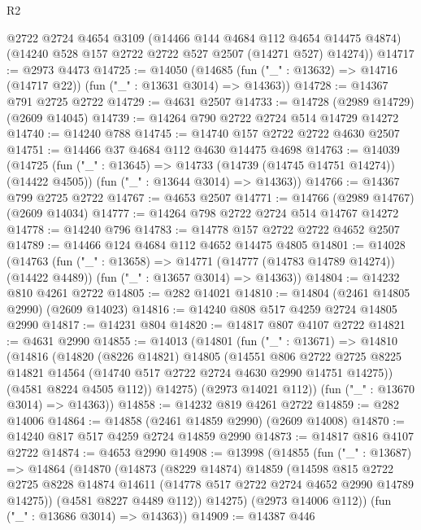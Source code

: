 \begin{lexlean}{R2}
\begin{coremodule}
      @2722
      @2724
      @4654
      @3109
      (@14466 @144 @4684 @112 @4654 @14475 @4874)
      (@14240 @528 @157 @2722 @2722 @527 @2507 (@14271 @527) @14274))
@14717 := @2973 @4473
@14725 := @14050
    (@14685 (fun ("_" : @13632) => @14716 (@14717 @22)) (fun ("_" : @13631 @3014) => @14363))
@14728 := @14367 @791 @2725 @2722
@14729 := @4631 @2507
@14733 := @14728 (@2989 @14729) (@2609 @14045)
@14739 := @14264 @790 @2722 @2724 @514 @14729 @14272
@14740 := @14240 @788
@14745 := @14740 @157 @2722 @2722 @4630 @2507
@14751 := @14466 @37 @4684 @112 @4630 @14475 @4698
@14763 := @14039
    (@14725
      (fun ("_" : @13645) => @14733 (@14739 (@14745 @14751 @14274)) (@14422 @4505))
      (fun ("_" : @13644 @3014) => @14363))
@14766 := @14367 @799 @2725 @2722
@14767 := @4653 @2507
@14771 := @14766 (@2989 @14767) (@2609 @14034)
@14777 := @14264 @798 @2722 @2724 @514 @14767 @14272
@14778 := @14240 @796
@14783 := @14778 @157 @2722 @2722 @4652 @2507
@14789 := @14466 @124 @4684 @112 @4652 @14475 @4805
@14801 := @14028
    (@14763
      (fun ("_" : @13658) => @14771 (@14777 (@14783 @14789 @14274)) (@14422 @4489))
      (fun ("_" : @13657 @3014) => @14363))
@14804 := @14232 @810 @4261 @2722
@14805 := @282 @14021
@14810 := @14804 (@2461 @14805 @2990) (@2609 @14023)
@14816 := @14240 @808 @517 @4259 @2724 @14805 @2990
@14817 := @14231 @804
@14820 := @14817 @807 @4107 @2722
@14821 := @4631 @2990
@14855 := @14013
    (@14801
      (fun ("_" : @13671) =>
      @14810
        (@14816
          (@14820
            (@8226 @14821)
            @14805
            (@14551
              @806
              @2722
              @2725
              @8225
              @14821
              @14564
              (@14740 @517 @2722 @2724 @4630 @2990 @14751 @14275))
            (@4581 @8224 @4505 @112))
          @14275)
        (@2973 @14021 @112))
      (fun ("_" : @13670 @3014) => @14363))
@14858 := @14232 @819 @4261 @2722
@14859 := @282 @14006
@14864 := @14858 (@2461 @14859 @2990) (@2609 @14008)
@14870 := @14240 @817 @517 @4259 @2724 @14859 @2990
@14873 := @14817 @816 @4107 @2722
@14874 := @4653 @2990
@14908 := @13998
    (@14855
      (fun ("_" : @13687) =>
      @14864
        (@14870
          (@14873
            (@8229 @14874)
            @14859
            (@14598
              @815
              @2722
              @2725
              @8228
              @14874
              @14611
              (@14778 @517 @2722 @2724 @4652 @2990 @14789 @14275))
            (@4581 @8227 @4489 @112))
          @14275)
        (@2973 @14006 @112))
      (fun ("_" : @13686 @3014) => @14363))
@14909 := @14387 @446

\end{coremodule}
\end{lexlean}
